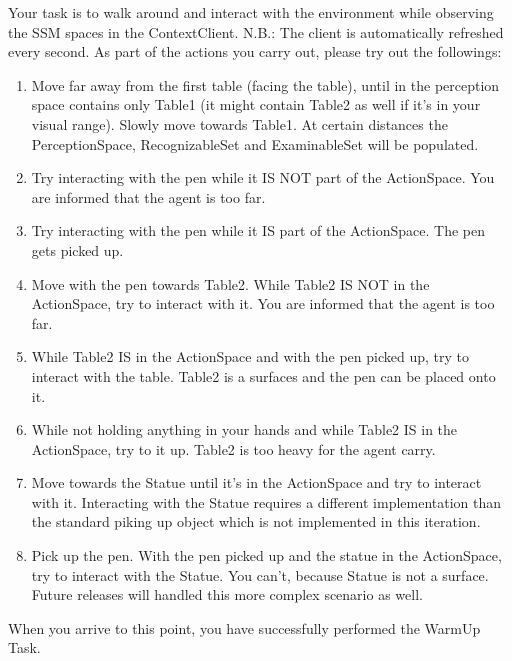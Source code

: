 Your task is to walk around and interact with the environment while observing the SSM spaces in the ContextClient. N.B.: The client is automatically refreshed every second. As part of the actions you carry out, please try out the followings:
\begin{enumerate}
	\item Move far away from the first table (facing the table), until in the perception space contains only Table1 (it might contain Table2 as well if it's in your visual range). Slowly move towards Table1. At certain distances the PerceptionSpace, RecognizableSet and ExaminableSet will be populated.
	\item Try interacting with the pen while it IS NOT part of the ActionSpace. You are informed that the agent is too far.
	\item Try interacting with the pen while it IS part of the ActionSpace. The pen gets picked up.
	\item Move with the pen towards Table2. While Table2 IS NOT in the ActionSpace, try to interact with it. You are informed that the agent is too far.
	\item While Table2 IS in the ActionSpace and with the pen picked up, try to interact with the table. Table2 is a surfaces and the pen can be placed onto it.
	\item While not holding anything in your hands and while Table2 IS in the ActionSpace, try to it up. Table2 is too heavy for the agent carry.
	\item Move towards the Statue until it's in the ActionSpace and try to interact with it. Interacting with the Statue requires a different implementation than the standard piking up object which is not implemented in this iteration.
	\item Pick up the pen. With the pen picked up and the statue in the ActionSpace, try to interact with the Statue. You can't, because Statue is not a surface. Future releases will handled this more complex scenario as well.
\end{enumerate}

When you arrive to this point, you have successfully performed the WarmUp Task.
